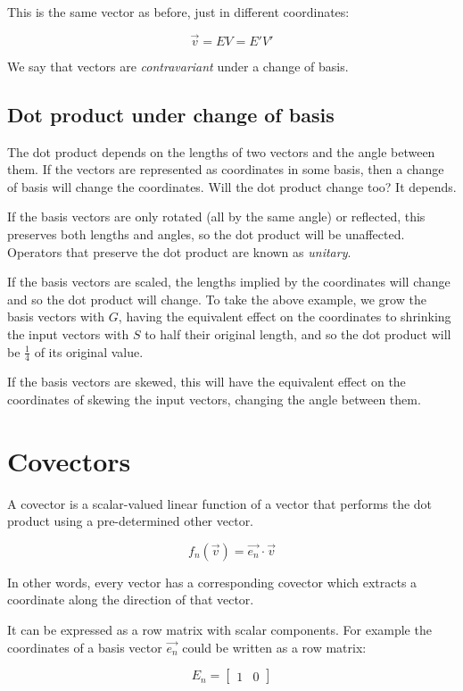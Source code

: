 This is the same vector as before, just in different coordinates:

$$\vec{v} = EV = E'V'$$

We say that vectors are \textit{contravariant} under a change of basis.

\subsection{Dot product under change of basis}

The dot product depends on the lengths of two vectors and the angle between them. If the vectors are represented as coordinates in some basis, then a change of basis will change the coordinates. Will the dot product change too? It depends.

If the basis vectors are only rotated (all by the same angle) or reflected, this preserves both lengths and angles, so the dot product will be unaffected. Operators that preserve the dot product are known as \textit{unitary}.

If the basis vectors are scaled, the lengths implied by the coordinates will change and so the dot product will change. To take the above example, we grow the basis vectors with $G$, having the equivalent effect on the coordinates to shrinking the input vectors with $S$ to half their original length, and so the dot product will be $\frac{1}{4}$ of its original value.

If the basis vectors are skewed, this will have the equivalent effect on the coordinates of skewing the input vectors, changing the angle between them.

\section{Covectors}

A covector is a scalar-valued linear function of a vector that performs the dot product using a pre-determined other vector.

$$f_n(\vec{v}) = \vec{e_n} \cdot \vec{v}$$

In other words, every vector has a corresponding covector which extracts a coordinate along the direction of that vector.

It can be expressed as a row matrix with scalar components. For example the coordinates of a basis vector $\vec{e_n}$ could be written as a row matrix:

$$E_n = \begin{bmatrix}1 & 0\end{bmatrix}$$

